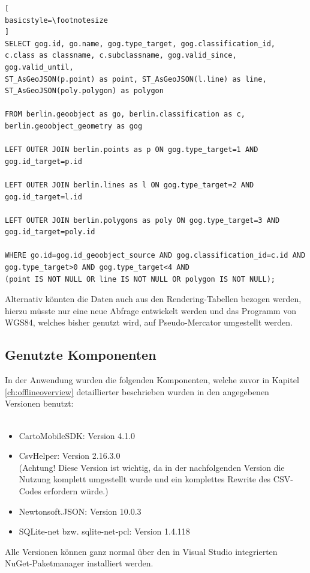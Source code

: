 \begin{lstlisting}[
basicstyle=\footnotesize
]
SELECT gog.id, go.name, gog.type_target, gog.classification_id, 
c.class as classname, c.subclassname, gog.valid_since, gog.valid_until, 
ST_AsGeoJSON(p.point) as point, ST_AsGeoJSON(l.line) as line, 
ST_AsGeoJSON(poly.polygon) as polygon

FROM berlin.geoobject as go, berlin.classification as c, berlin.geoobject_geometry as gog

LEFT OUTER JOIN berlin.points as p ON gog.type_target=1 AND gog.id_target=p.id

LEFT OUTER JOIN berlin.lines as l ON gog.type_target=2 AND gog.id_target=l.id

LEFT OUTER JOIN berlin.polygons as poly ON gog.type_target=3 AND gog.id_target=poly.id

WHERE go.id=gog.id_geoobject_source AND gog.classification_id=c.id AND 
gog.type_target>0 AND gog.type_target<4 AND 
(point IS NOT NULL OR line IS NOT NULL OR polygon IS NOT NULL);
\end{lstlisting}

Alternativ könnten die Daten auch aus den Rendering-Tabellen bezogen werden, hierzu müsste nur eine neue Abfrage entwickelt werden und das Programm von WGS84, welches bisher genutzt wird, auf Pseudo-Mercator umgestellt werden.

\subsection{Genutzte Komponenten}

In der Anwendung wurden die folgenden Komponenten, welche zuvor in Kapitel \ref{ch:offlineoverview} detaillierter beschrieben wurden in den angegebenen Versionen benutzt:\\
\\
\begin{itemize}
	\item CartoMobileSDK: Version 4.1.0
	\item CsvHelper: Version 2.16.3.0\\(Achtung! Diese Version ist wichtig, da in der nachfolgenden Version die Nutzung komplett umgestellt wurde und ein komplettes Rewrite des CSV-Codes erfordern würde.)
	\item Newtonsoft.JSON: Version 10.0.3
	\item SQLite-net bzw. sqlite-net-pcl: Version 1.4.118 
\end{itemize}
Alle Versionen können ganz normal über den in Visual Studio integrierten NuGet-Paketmanager installiert werden.
\newpage
